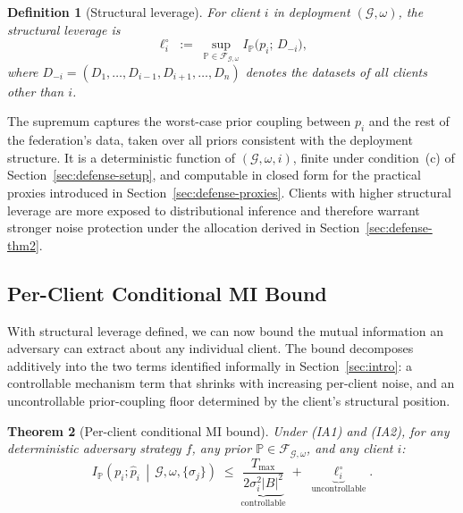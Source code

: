 \documentclass[letterpaper,journal]{IEEEtran}
\newtheorem{theorem}{Theorem}[section]
\newtheorem{definition}[theorem]{Definition}
\begin{document}
\begin{definition}[Structural leverage]
\label{def:leverage}
For client $i$ in deployment $(\mathcal{G}, \omega)$, the structural
leverage is
\[
\ell_i^\circ \;:=\; \sup_{\mathbb{P} \in \mathcal{F}_{\mathcal{G},\omega}}
I_{\mathbb{P}}\big(p_i;\, D_{-i}\big),
\]
where $D_{-i} = (D_1, \ldots, D_{i-1}, D_{i+1}, \ldots, D_n)$
denotes the datasets of all clients other than $i$.
\end{definition}

The supremum captures the worst-case prior coupling between $p_i$
and the rest of the federation's data, taken over all priors
consistent with the deployment structure. It is a deterministic
function of $(\mathcal{G}, \omega, i)$, finite under condition~(c)
of Section~\ref{sec:defense-setup}, and computable in closed form
for the practical proxies introduced in
Section~\ref{sec:defense-proxies}. Clients with higher structural
leverage are more exposed to distributional inference and therefore
warrant stronger noise protection under the allocation derived in
Section~\ref{sec:defense-thm2}.

\subsection{Per-Client Conditional MI Bound}
\label{sec:defense-thm1}

With structural leverage defined, we can now bound the mutual
information an adversary can extract about any individual client.
The bound decomposes additively into the two terms identified
informally in Section~\ref{sec:intro}: a controllable mechanism term
that shrinks with increasing per-client noise, and an uncontrollable
prior-coupling floor determined by the client's structural position.

\begin{theorem}[Per-client conditional MI bound]
\label{thm:per-client}
Under (IA1) and (IA2), for any deterministic adversary strategy $f$,
any prior $\mathbb{P} \in \mathcal{F}_{\mathcal{G},\omega}$, and any
client $i$:
\begin{equation}
I_{\mathbb{P}}\!\left(p_i;\hat{p}_i \,\middle|\,
\mathcal{G},\omega,\{\sigma_j\}\right)
\;\leq\;
\underbrace{\frac{T_{\max}}{2\sigma_i^2 |B|^2}}_{\text{controllable}}
\;+\;
\underbrace{\ell_i^\circ}_{\text{uncontrollable}}.
\label{eq:thm1}
\end{equation}
\end{theorem}
\end{document}
